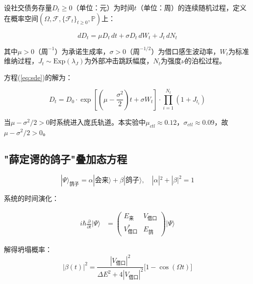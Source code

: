\documentclass[journal]{IEEEtran}
\begin{document}
设社交债务存量$D_t \geq 0$（单位：元）为时间$t$（单位：周）的连续随机过程，定义在概率空间$(\Omega, \mathcal{F}, \{\mathcal{F}_t\}_{t \geq 0}, \mathbb{P})$上：

\begin{equation}
\label{eq:sde}
dD_t = \mu D_t\,dt + \sigma D_t\,dW_t + J_t\,dN_t
\end{equation}

其中$\mu > 0$（$\text{周}^{-1}$）为承诺生成率，$\sigma > 0$（$\text{周}^{-1/2}$）为借口感生波动率，$W_t$为标准维纳过程，$J_t \sim \text{Exp}(\lambda_J)$为外部冲击跳跃幅度，$N_t$为强度$\nu$的泊松过程。

方程(\ref{eq:sde})的解为：

\begin{equation}
\label{eq:solution}
D_t = D_0 \cdot \exp\left[\left(\mu - \frac{\sigma^2}{2}\right)t + \sigma W_t\right] \cdot \prod_{i=1}^{N_t} (1 + J_{t_i})
\end{equation}

当$\mu - \sigma^2/2 > 0$时系统进入庞氏轨道。本实验中$\mu_{ctl} \approx 0.12$，$\sigma_{ctl} \approx 0.09$，故$\mu - \sigma^2/2 > 0$。

\subsection{"薛定谔的鸽子"叠加态方程}

\begin{equation}
\label{eq:schrodinger}
|\Psi\rangle_{\text{鸽子}} = \alpha|\text{会来}\rangle + \beta|\text{鸽子}\rangle, \quad |\alpha|^2 + |\beta|^2 = 1
\end{equation}

系统的时间演化：

\begin{equation}
\begin{aligned}
i\hbar\frac{\partial}{\partial t}|\Psi\rangle &=
\begin{pmatrix}
E_{\text{来}} & V_{\text{借口}} \\[3pt]
V_{\text{借口}}^* & E_{\text{鸽}}
\end{pmatrix}
|\Psi\rangle
\end{aligned}
\label{eq:schrodinger_eq}
\end{equation}

解得坍塌概率：
\begin{equation}
\label{eq:collapse_prob}
|\beta(t)|^2 = \frac{|V_{\text{借口}}|^2}{\Delta E^2 + 4|V_{\text{借口}}|^2} \bigl[1 - \cos(\Omega t)\bigr]
\end{equation}
\end{document}
